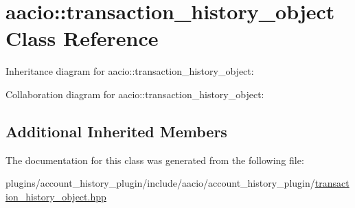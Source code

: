 \hypertarget{classaacio_1_1transaction__history__object}{}\section{aacio\+:\+:transaction\+\_\+history\+\_\+object Class Reference}
\label{classaacio_1_1transaction__history__object}


Inheritance diagram for aacio\+:\+:transaction\+\_\+history\+\_\+object\+:


Collaboration diagram for aacio\+:\+:transaction\+\_\+history\+\_\+object\+:
\subsection*{Additional Inherited Members}


The documentation for this class was generated from the following file\+:\begin{DoxyCompactItemize}
\item 
plugins/account\+\_\+history\+\_\+plugin/include/aacio/account\+\_\+history\+\_\+plugin/\mbox{\hyperlink{transaction__history__object_8hpp}{transaction\+\_\+history\+\_\+object.\+hpp}}\end{DoxyCompactItemize}
